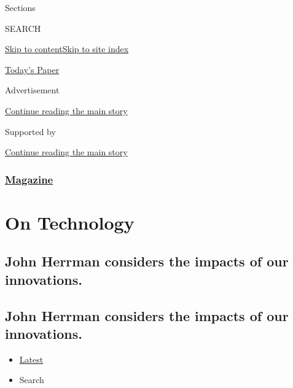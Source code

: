 Sections

SEARCH

\protect\hyperlink{site-content}{Skip to
content}\protect\hyperlink{site-index}{Skip to site index}

\href{https://myaccount.nytimes3xbfgragh.onion/auth/login?response_type=cookie\&client_id=vi}{}

\href{https://www.nytimes3xbfgragh.onion/section/todayspaper}{Today's
Paper}

Advertisement

\protect\hyperlink{after-top}{Continue reading the main story}

Supported by

\protect\hyperlink{after-sponsor}{Continue reading the main story}

\hypertarget{magazine}{%
\subsubsection{\texorpdfstring{\href{/section/magazine}{Magazine}}{Magazine}}\label{magazine}}

\hypertarget{on-technology}{%
\section{On Technology}\label{on-technology}}

\hypertarget{john-herrman-considers-the-impacts-of-our-innovations}{%
\subsection{John Herrman considers the impacts of our
innovations.}\label{john-herrman-considers-the-impacts-of-our-innovations}}

\hypertarget{john-herrman-considers-the-impacts-of-our-innovations-1}{%
\subsection{John Herrman considers the impacts of our
innovations.}\label{john-herrman-considers-the-impacts-of-our-innovations-1}}

\begin{itemize}
\tightlist
\item
  \protect\hyperlink{stream-panel}{Latest}
\item
  Search
\end{itemize}


